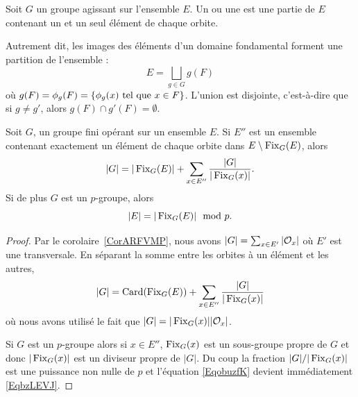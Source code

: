 \begin{definition}  \label{DefcSuYxz}
    Soit \( G\) un groupe agissant sur l'ensemble \( E\). Un  ou une  est une partie de \( E\) contenant un et un seul élément de chaque orbite.
\end{definition}
Autrement dit, les images des éléments d'un domaine fondamental forment une partition de l'ensemble :
\begin{equation}
    E=\bigsqcup_{g\in G}g(F)
\end{equation}
où  \( g(F) = \phi_g(F) = \{ \phi_g(x) \text{ tel que } x \in F\} \). L'union est disjointe, c'est-à-dire que si \( g\neq g'\), alors \( g(F)\cap g'(F)=\emptyset\).




\begin{proposition}     \label{PropUyLPdp}
    Soit \( G\), un groupe fini opérant sur un ensemble \( E\). Si \( E''\) est un ensemble contenant exactement un élément de chaque orbite dans \( E\setminus\operatorname{Fix}_G(E)\), alors
    \begin{equation}        \label{EqobuzfK}
        | G |=| \operatorname{Fix}_G(E) |+\sum_{x\in E''}\frac{ | G | }{ | \operatorname{Fix}_G(x) | }.
    \end{equation}
    Si de plus \( G\) est un $p$-groupe, alors
    \begin{equation}    \label{EqbzLEVJ}
        | E |=| \operatorname{Fix}_G(E) |\mod p.
    \end{equation}
\end{proposition}

\begin{proof}
    Par le corolaire~\ref{CorARFVMP}, nous avons \( | G |=\sum_{x\in E'}| \mathcal{O}_x |\) où \( E'\) est une transversale.  En séparant la somme entre les orbites à un élément et les autres,
    \begin{equation}    \label{EqeggkBs}
        | G |=\operatorname{Card}(\operatorname{Fix}_G(E))+\sum_{x\in E''}\frac{ | G | }{ | \operatorname{Fix}_G(x) | }
    \end{equation}  \label{EqDgYbhm}
    où nous avons utilisé le fait que \( | G |=| \operatorname{Fix}_G(x) | |\mathcal{O}_x |\).

    Si \( G\) est un \( p\)-groupe alors si \( x\in E''\), \( \operatorname{Fix}_G(x)\) est un sous-groupe propre de \( G\) et donc \( | \operatorname{Fix}_G(x) |\) est un diviseur propre de \( | G |\). Du coup la fraction \( | G |/|\operatorname{Fix}_G(x)|\) est une puissance non nulle de \( p\) et l'équation \eqref{EqobuzfK} devient immédiatement \eqref{EqbzLEVJ}.
\end{proof}


